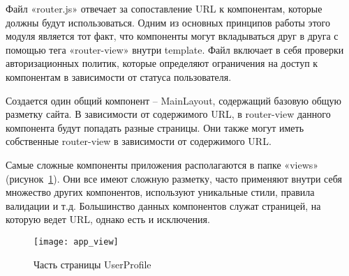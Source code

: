Файл «router.js» отвечает за сопоставление URL к компонентам, которые должны будут использоваться. Одним из основных принципов работы этого модуля является тот факт, что компоненты могут вкладываться друг в друга с помощью тега «router-view» внутри template. Файл включает в себя проверки авторизационных политик, которые определяют ограничения на доступ к компонентам в зависимости от статуса пользователя.

Создается один общий компонент – MainLayout, содержащий базовую общую разметку сайта. В зависимости от содержимого URL, в router-view данного компонента будут попадать разные страницы. Они также могут иметь собственные router-view в зависимости от содержимого URL.

Самые сложные компоненты приложения располагаются в папке «views» (рисунок~\ref{fig:app_view}). Они все имеют сложную разметку, часто применяют внутри себя множество других компонентов, используют уникальные стили, правила валидации и т.д. Большинство данных компонентов служат страницей, на которую ведет URL, однако есть и исключения.

\begin{figure}[h]
    \centering
    \texttt{[image: app\_view]}
    \caption{Часть страницы UserProfile}\label{fig:app_view}
\end{figure}
